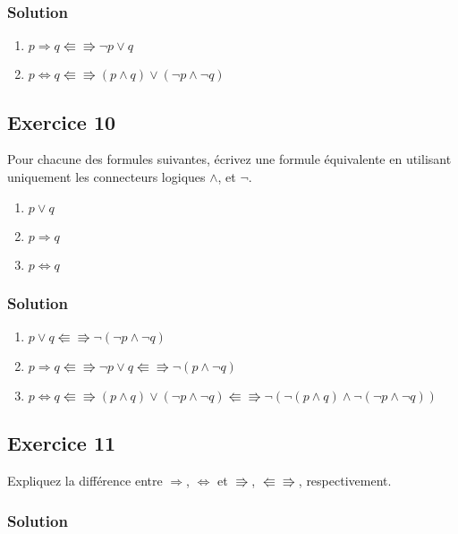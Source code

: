 \subsubsection*{Solution}

    \begin{enumerate}
        \item $p \Rightarrow q \Lleftarrow \Rrightarrow \neg p \lor q$
        \item $p \Leftrightarrow q \Lleftarrow \Rrightarrow (p \land q) \lor (\neg p \land \neg q)$
    \end{enumerate}

\subsection*{Exercice 10}
Pour chacune des formules suivantes, écrivez une formule équivalente
en utilisant uniquement les connecteurs logiques $\land$, et $\neg$.
\begin{enumerate}
	\item $p \lor q$
	\item $p \Rightarrow q$
	\item $p \Leftrightarrow q$
\end{enumerate}


\subsubsection*{Solution}

    \begin{enumerate}
        \item $p \lor q \Lleftarrow \Rrightarrow \neg (\neg p \land \neg q)$
        \item $p \Rightarrow q \Lleftarrow \Rrightarrow \neg p \lor q \Lleftarrow \Rrightarrow \neg (p \land \neg q)$
        \item $p \Leftrightarrow q \Lleftarrow \Rrightarrow (p \land q) \lor (\neg p \land \neg q) \Lleftarrow \Rrightarrow \neg(\neg(p \land q) \land \neg(\neg p \land \neg q))$
    \end{enumerate}

\subsection*{Exercice 11}
Expliquez la différence entre $\Rightarrow$, $\Leftrightarrow$ et $\Rrightarrow$, $\Lleftarrow\!\!\!\!\Rrightarrow$, respectivement.


\subsubsection*{Solution}

